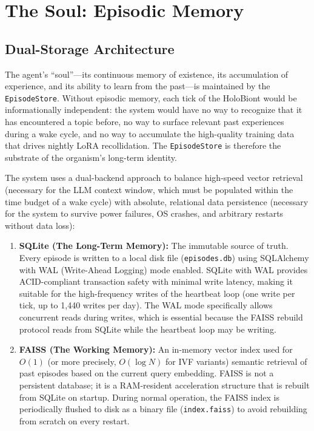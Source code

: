 \chapter{The Soul: Episodic Memory}

\section{Dual-Storage Architecture}

The agent's ``soul''---its continuous memory of existence, its accumulation of experience, and its ability to learn from the past---is maintained by the \texttt{EpisodeStore}. Without episodic memory, each tick of the HoloBiont would be informationally independent: the system would have no way to recognize that it has encountered a topic before, no way to surface relevant past experiences during a wake cycle, and no way to accumulate the high-quality training data that drives nightly LoRA recollidation. The \texttt{EpisodeStore} is therefore the substrate of the organism's long-term identity.

The system uses a dual-backend approach to balance high-speed vector retrieval (necessary for the LLM context window, which must be populated within the time budget of a wake cycle) with absolute, relational data persistence (necessary for the system to survive power failures, OS crashes, and arbitrary restarts without data loss):

\begin{enumerate}
    \item \textbf{SQLite (The Long-Term Memory):} The immutable source of truth. Every episode is written to a local disk file (\texttt{episodes.db}) using SQLAlchemy with WAL (Write-Ahead Logging) mode enabled. SQLite with WAL provides ACID-compliant transaction safety with minimal write latency, making it suitable for the high-frequency writes of the heartbeat loop (one write per tick, up to 1,440 writes per day). The WAL mode specifically allows concurrent reads during writes, which is essential because the FAISS rebuild protocol reads from SQLite while the heartbeat loop may be writing.

    \item \textbf{FAISS (The Working Memory):} An in-memory vector index used for $O(1)$ (or more precisely, $O(\log N)$ for IVF variants) semantic retrieval of past episodes based on the current query embedding. FAISS is not a persistent database; it is a RAM-resident acceleration structure that is rebuilt from SQLite on startup. During normal operation, the FAISS index is periodically flushed to disk as a binary file (\texttt{index.faiss}) to avoid rebuilding from scratch on every restart.
\end{enumerate}

